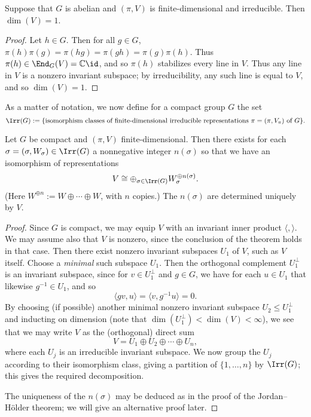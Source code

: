 \documentclass[reqno]{amsart} 
\begin{document}
\begin{corollary}\label{cor:schur-ab}
  Suppose that $G$ is abelian and $(\pi,V)$ is finite-dimensional and irreducible.  Then $\dim(V) = 1$.
\end{corollary}
\begin{proof}
  Let $h \in G$.  Then for all $g \in G$, $\pi(h) \pi(g) = \pi(h g) = \pi(g h) = \pi(g) \pi(h)$.  Thus $\pi(h) \in \End_G(V) = \mathbb{C} \id$, and so $\pi(h)$ stabilizes every line in $V$.  Thus any line in $V$ is a nonzero invariant subspace; by irreducibility, any such line is equal to $V$, and so $\dim(V) = 1$.
\end{proof}

As a matter of notation, we now define for a compact group $G$ the set
\begin{equation*}
  \Irr(G) := \{\text{isomorphism classes of finite-dimensional irreducible representations $\pi = (\pi,V_\pi)$ of $G$}\}.
\end{equation*}

\begin{theorem}\label{thm:complete-reducibility-compact-group}
  Let $G$ be compact and $(\pi,V)$ finite-dimensional.  Then there exists for each $\sigma = (\sigma,W_\sigma) \in \Irr(G)$ a nonnegative integer $n(\sigma)$ so that we have an isomorphism of representations
  \begin{equation}\label{eq:}
    V \cong \oplus_{\sigma \in \Irr(G)} W_\sigma^{\oplus n(\sigma)}.
  \end{equation}
  (Here $W^{\oplus n} := W \oplus \dotsb \oplus W$, with $n$ copies.)  The $n(\sigma)$ are determined uniquely by $V$.
\end{theorem}
\begin{proof}
  Since $G$ is compact, we may equip $V$ with an invariant inner product $\langle , \rangle$.  We may assume also that $V$ is nonzero, since the conclusion of the theorem holds in that case.  Then there exist nonzero invariant subspaces $U_1$ of $V$, such as $V$ itself.  Choose a \emph{minimal} such subspace $U_1$.  Then the orthogonal complement $U_1^\perp$ is an invariant subspace, since for $v \in U_1^\perp$ and $g \in G$, we have for each $u \in U_1$ that likewise $g^{-1} \in U_1$, and so
  \begin{equation*}
    \langle g v, u \rangle = \langle v, g^{-1} u \rangle = 0.
  \end{equation*}
  By choosing (if possible) another minimal nonzero invariant subspace $U_2 \leq U_1^\perp$ and inducting on dimension (note that $\dim(U_1^\perp) < \dim(V) < \infty$), we see that we may write $V$ as the (orthogonal) direct sum
  \begin{equation}\label{eq:}
    V = U_1 \oplus U_2 \oplus \dotsb \oplus U_n,
  \end{equation}
  where each $U_j$ is an irreducible invariant subspace.  We now group the $U_j$ according to their isomorphism class, giving a partition of $\{1, \dotsc, n\}$ by $\Irr(G)$; this gives the required decomposition.

  The uniqueness of the $n(\sigma)$ may be deduced as in the proof of the Jordan--H{\"o}lder theorem; we will give an alternative proof later.
\end{proof}
\end{document}
